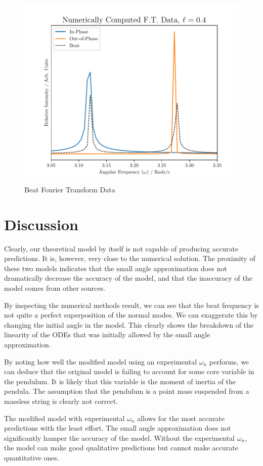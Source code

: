 \documentclass[aps,prl,reprint,10pt,amsmath,amssymb,superscriptaddress,a4paper, floatfix]{revtex4-2}
\begin{document}
\begin{figure}[H]
    \includegraphics[width = 8 cm]{Numerical.pdf}
    \caption{Beat Fourier Transform Data}
    \label{fig:beat}
\end{figure}

\section{Discussion}

Clearly, our theoretical model by itself is not capable of producing accurate predictions. It is, however, very close to the numerical solution. The proximity of these two models indicates that the small angle approximation does not dramatically decrease the accuracy of the model, and that the inaccuracy of the model comes from other sources.

By inspecting the numerical methods result, we can see that the beat frequency is not quite a perfect superposition of the normal modes. We can exaggerate this by changing the initial angle in the model. This clearly shows the breakdown of the linearity of the ODEs that was initially allowed by the small angle approximation. 

By noting how well the modified model using an experimental $\omega_n$ performs, we can deduce that the original model is failing to account for some core variable in the pendulum. It is likely that this variable is the moment of inertia of the pendula. The assumption that the pendulum is a point mass suspended from a massless string is clearly not correct.

The modified model with experimental $\omega_n$ allows for the most accurate predictions with the least effort. The small angle approximation does not significantly hamper the accuracy of the model. Without the experimental $\omega_n$, the model can make good qualitative predictions but cannot make accurate quantitative ones.
\end{document}
